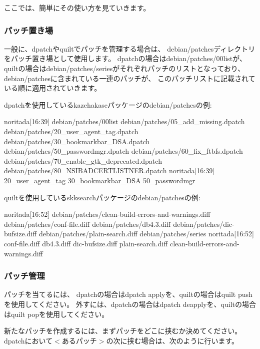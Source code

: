 \documentclass[mingoth,a4paper]{jsarticle}
\begin{document}
ここでは、簡単にその使い方を見ていきます。

\subsubsection{パッチ置き場}

一般に、dpatchやquiltでパッチを管理する場合は、
debian/patchesディレクトリをパッチ置き場として使用します。
dpatchの場合はdebian/patches/00listが、
quiltの場合はdebian/patches/seriesがそれぞれパッチのリストとなっており、
debian/patchesに含まれている一連のパッチが、
このパッチリストに記載されている順に適用されていきます。

dpatchを使用しているkazehakaseパッケージのdebian/patchesの例:

\begin{commandline}
noritada[16:39]%
debian/patches/00list
debian/patches/05_add_missing.dpatch
debian/patches/20_user_agent_tag.dpatch
debian/patches/30_bookmarkbar_DSA.dpatch
debian/patches/50_passwordmgr.dpatch
debian/patches/60_fix_ftbfs.dpatch
debian/patches/70_enable_gtk_deprecated.dpatch
debian/patches/80_NSIBADCERTLISTNER.dpatch
noritada[16:39]%
20_user_agent_tag
30_bookmarkbar_DSA
50_passwordmgr
\end{commandline}

quiltを使用しているskksearchパッケージのdebian/patchesの例:

\begin{commandline}
noritada[16:52]%
debian/patches/clean-build-errors-and-warnings.diff
debian/patches/conf-file.diff
debian/patches/db4.3.diff
debian/patches/dic-bufsize.diff
debian/patches/plain-search.diff
debian/patches/series
noritada[16:52]%
conf-file.diff
db4.3.diff
dic-bufsize.diff
plain-search.diff
clean-build-errors-and-warnings.diff
\end{commandline}

\subsubsection{パッチ管理}

パッチを当てるには、
dpatchの場合はdpatch applyを、quiltの場合はquilt pushを使用してください。
外すには、dpatchの場合はdpatch deapplyを、quiltの場合はquilt popを使用してください。

新たなパッチを作成するには、まずパッチをどこに挟むか決めてください。
dpatchにおいて$<$あるパッチ$>$の次に挟む場合は、次のように行います。
\end{document}

